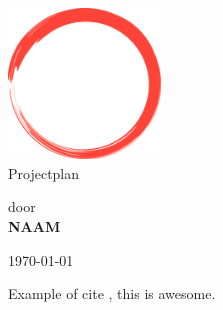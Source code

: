 \documentclass[12pt]{scrreprt}
\begin{document}
\begin{titlepage}
        \begin{center}
	\includegraphics[height=4cm]{includes/logo}\\
        \vspace{8mm}
        \LARGE{Projectplan}\\
        \vspace{48mm}
        
        \large{door\\
        \textbf{NAAM}\\
        }        

        \vspace{4mm}
        \monthyeardate\today

	\end{center}

        \restoregeometry
\end{titlepage}
\nopagecolor 
    
\begingroup
\let\clearpage\relax
\tableofcontents
\endgroup




Example of cite \cite{problem1}, this is awesome.


\printbibliography
\end{document}
